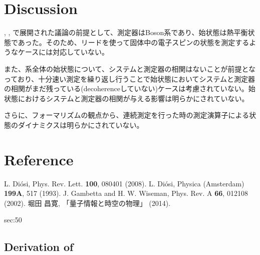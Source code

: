 \documentclass[10pt, a4paper]{jsarticle}
\begin{document}
\section{Discussion}
\label{sec:30}

\cite{diosi2008retarted}, \cite{diosi1993master}, \cite{gambetta2002non-markov}で展開された議論の前提として、測定器はBoson系であり、始状態は熱平衡状態であった。そのため、リードを使って固体中の電子スピンの状態を測定するようなケースには対応していない。

また、系全体の始状態について、システムと測定器の相関はないことが前提となっており、十分速い測定を繰り返し行うことで始状態においてシステムと測定器の相関がまだ残っている(decoherenceしていない)ケースは考慮されていない。始状態におけるシステムと測定器の相関が与える影響は明らかにされていない。

さらに、フォーマリズムの観点から、連続測定を行った時の測定演算子による状態のダイナミクスは明らかにされていない。

\section{Reference}
\label{sec:40}

\begingroup
\renewcommand{\section}[2]{}
\begin{thebibliography}{0}
\setlength{\parskip}{0mm}
\setlength{\itemsep}{-0.3mm}
\small
	L. Di\'{o}si, Phys. Rev. Lett. \textbf{100}, 080401 (2008).
	L. Di\'{o}si, Physica (Amsterdam) \textbf{199A}, 517 (1993).
	J. Gambetta and H. W. Wiseman, Phys. Rev. A \textbf{66}, 012108 (2002).
	堀田 昌寛, 「量子情報と時空の物理」 (2014).
\end{thebibliography}
\endgroup


\section{Appendix}
\label{sec:50}

\subsection{Derivation of }
\label{sec:51}
\end{document}
